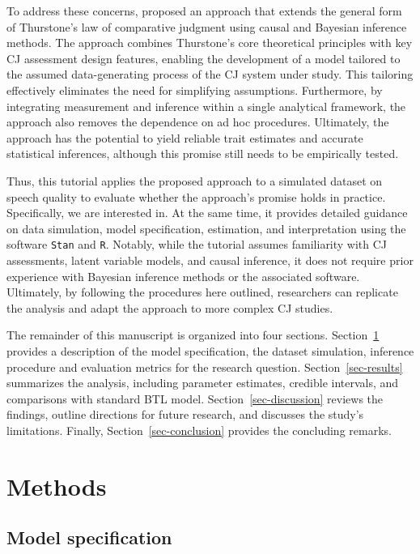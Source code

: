 \documentclass[
  authoryear,
  review,
  1p]{elsarticle}
\begin{document}
To address these concerns, \citet{Rivera_et_al_2025} proposed an
approach that extends the general form of Thurstone's law of comparative
judgment \citep{Thurstone_1927a, Thurstone_1927b} using causal and
Bayesian inference methods. The approach combines Thurstone's core
theoretical principles with key CJ assessment design features, enabling
the development of a model tailored to the assumed data-generating
process of the CJ system under study. This tailoring effectively
eliminates the need for simplifying assumptions. Furthermore, by
integrating measurement and inference within a single analytical
framework, the approach also removes the dependence on ad hoc
procedures. Ultimately, the approach has the potential to yield reliable
trait estimates and accurate statistical inferences, although this
promise still needs to be empirically tested.

Thus, this tutorial applies the proposed approach to a simulated dataset
on speech quality to evaluate whether the approach's promise holds in
practice. {Specifically, we are interested in}. At the same time, it
provides detailed guidance on data simulation, model specification,
estimation, and interpretation using the software \texttt{Stan} and
\texttt{R}. Notably, while the tutorial assumes familiarity with CJ
assessments, latent variable models, and causal inference, it does not
require prior experience with Bayesian inference methods or the
associated software. Ultimately, by following the procedures here
outlined, researchers can replicate the analysis and adapt the approach
to more complex CJ studies.

The remainder of this manuscript is organized into four sections.
Section~\ref{sec-methods} provides a description of the model
specification, the dataset simulation, inference procedure and
evaluation metrics for the research question. Section~\ref{sec-results}
summarizes the analysis, including parameter estimates, credible
intervals, and comparisons with standard BTL model.
Section~\ref{sec-discussion} reviews the findings, outline directions
for future research, and discusses the study's limitations. Finally,
Section~\ref{sec-conclusion} provides the concluding remarks.

\section{Methods}\label{sec-methods}

\subsection{Model specification}\label{sec-model}
\end{document}

